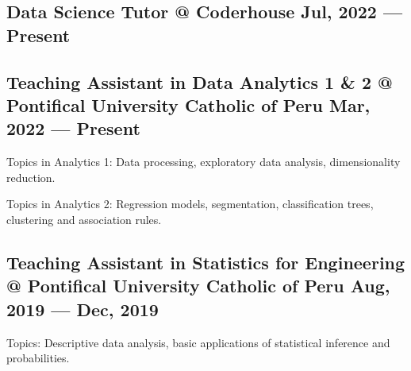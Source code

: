 \subsection{
    {Data Science Tutor @ Coderhouse \hfill Jul, 2022 --- Present}
}

\subsection{
    {Teaching Assistant in Data Analytics 1 \& 2 @ Pontifical University Catholic of Peru \hfill Mar, 2022 --- Present}
}
\begin{zitemize}
\item Topics in Analytics 1: Data processing, exploratory data analysis, dimensionality reduction.
\item Topics in Analytics 2: Regression models, segmentation, classification trees, clustering and association rules.
\end{zitemize}

\subsection{
    {Teaching Assistant in Statistics for Engineering @ Pontifical University Catholic of Peru \hfill Aug, 2019 --- Dec, 2019}
}
\begin{zitemize}
\item Topics: Descriptive data analysis, basic applications of statistical inference and probabilities.
\end{zitemize}

